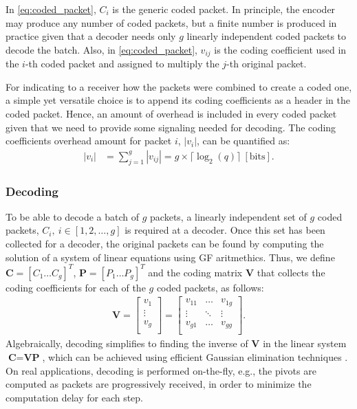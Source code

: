 In \eqref{eq:coded_packet}, $C_i$ is the generic coded packet. In principle,
the encoder may produce any number of coded packets, but a finite
number is produced in practice given that a decoder needs only
$g$ linearly independent coded packets to decode the batch. Also, in
\eqref{eq:coded_packet}, $v_{ij}$ is the coding coefficient used in the
$i$-th coded packet and assigned to multiply the $j$-th original packet.

For indicating to a receiver how the packets were combined
to create a coded one, a simple yet versatile choice is to append
its coding coefficients as a header in the coded packet. Hence, an
amount of overhead is included in every coded packet given that we
need to provide some signaling needed for decoding. The coding
coefficients overhead amount for packet $i$, $|v_i|$, can be quantified
as:
%
\begin{align} \label{eq:coded_packet_coef}
|v_i| &= \sum_{j=1}^{g} |v_{ij}| = g \times \lceil \log_{2} (q)
\rceil ~ [\mathrm{bits}].
\end{align}

\subsubsection{Decoding}
\label{sssec:decoding}
To be able to decode a batch of $g$ packets, a linearly independent set of $g$
coded packets, $C_i,\ i \in [1,2,\ldots,g]$ is required at a decoder.
Once this set has been collected for a decoder,
the original packets can be found by computing the solution of a system
of linear equations using \ac{GF} aritmethics. Thus, we define
$\textbf{C} = \left[C_1 \ldots C_g \right]^T$,
$\textbf{P} = \left[P_1 \ldots P_g \right]^T$ and the coding matrix
$\textbf{V}$ that collects the coding coefficients for each of the $g$
coded packets, as follows:
%
\begin{align} \label{eq:coding_matrix}
\textbf{V} =
\left[
\begin{array}{c}
        v_1    \\ \hline
        \vdots \\ \hline
        v_g    \\
\end{array}
\right]
=
\left[
\begin{array}{ccc}
        v_{11} & \ldots & v_{1g} \\
        \vdots  & \ddots & \vdots  \\
        v_{g1} & \ldots & v_{gg} \\
\end{array}
\right].
\end{align}
%
Algebraically, decoding simplifies to finding the inverse of
$\textbf{V}$ in the linear system
$\textbf{C} = \textbf{V} \textbf{P}$, which can be achieved using
efficient Gaussian elimination techniques \cite{fragouli2006network}.
On real applications, decoding is performed on-the-fly, e.g., the
pivots are computed as packets are progressively received, in order to
minimize the computation delay for each step.

